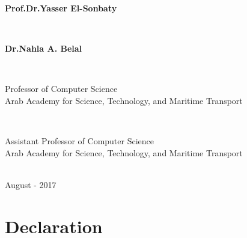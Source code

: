 \documentclass[12pt,openany]{llncs}
\begin{document}
\begin{titlepage}
{\begin{minipage}{0.55\textwidth}
{\large \bfseries Prof.Dr.Yasser El-Sonbaty}
\end{minipage}
~
\begin{minipage}{0.40\textwidth}
{\large \bfseries Dr.Nahla A. Belal}
\end{minipage}\\[0.2cm]

\begin{minipage}{0.47\textwidth}
\begin{flushleft}
\center
{\small Professor of Computer Science}\\
{\small Arab Academy for Science, Technology, and Maritime Transport}
\end{flushleft}
\end{minipage}
~
\begin{minipage}{0.47\textwidth}
\begin{flushright}
\center
{\small Assistant Professor of Computer Science}\\
{\small Arab Academy for Science, Technology, and Maritime Transport}
\end{flushright}
\end{minipage}\\[0.2cm]
{\small August - 2017}\\[0cm] 
\vfill %
}

\clearpage

\end{titlepage}

{
\clearpage\thispagestyle{empty}
\titleformat{\section}[block]{\Large\bfseries\filcenter}{}{1em}{}
\section*{Declaration}

\hspace{-50pt}
\noindent{}
}
\end{document}
